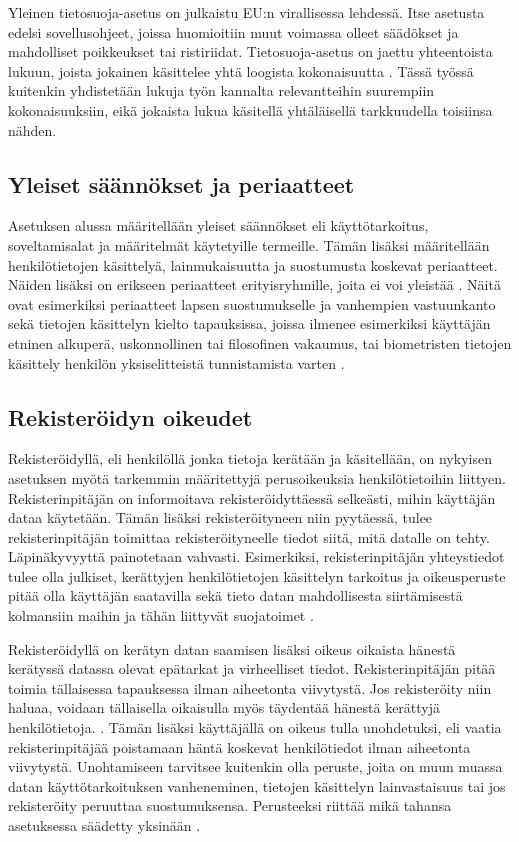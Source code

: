 \documentclass[finnish]{tktltiki}
\begin{document}
Yleinen tietosuoja-asetus on julkaistu EU:n virallisessa lehdessä. Itse asetusta edelsi sovellusohjeet, joissa huomioitiin muut voimassa olleet säädökset ja mahdolliset poikkeukset tai ristiriidat. Tietosuoja-asetus on jaettu yhteentoista lukuun, joista jokainen käsittelee yhtä loogista kokonaisuutta \cite{eu2016}. Tässä työssä kuitenkin yhdistetään lukuja työn kannalta relevantteihin suurempiin kokonaisuuksiin, eikä jokaista lukua käsitellä yhtäläisellä tarkkuudella toisiinsa nähden.

\subsection{Yleiset säännökset ja periaatteet}

Asetuksen alussa määritellään yleiset säännökset eli käyttötarkoitus, soveltamisalat ja määritelmät käytetyille termeille. Tämän lisäksi määritellään henkilötietojen käsittelyä, lainmukaisuutta ja suostumusta koskevat periaatteet. Näiden lisäksi on erikseen periaatteet erityisryhmille, joita ei voi yleistää \cite{eu2016,tikkinen}. Näitä ovat esimerkiksi periaatteet lapsen suostumukselle ja vanhempien vastuunkanto sekä tietojen käsittelyn kielto tapauksissa, joissa ilmenee esimerkiksi käyttäjän etninen alkuperä, uskonnollinen tai filosofinen vakaumus, tai biometristen tietojen käsittely henkilön yksiselitteistä tunnistamista varten \cite{eu2016,tikkinen}.

\subsection{Rekisteröidyn oikeudet}

Rekisteröidyllä, eli henkilöllä jonka tietoja kerätään ja käsitellään, on nykyisen asetuksen myötä tarkemmin määritettyjä perusoikeuksia henkilötietoihin liittyen. Rekisterinpitäjän on informoitava rekisteröidyttäessä selkeästi, mihin käyttäjän dataa käytetään. Tämän lisäksi rekisteröityneen niin pyytäessä, tulee rekisterinpitäjän toimittaa rekisteröityneelle tiedot siitä, mitä datalle on tehty. Läpinäkyvyyttä painotetaan vahvasti. Esimerkiksi, rekisterinpitäjän yhteystiedot tulee olla julkiset, kerättyjen henkilötietojen käsittelyn tarkoitus ja oikeusperuste pitää olla käyttäjän saatavilla sekä tieto datan mahdollisesta siirtämisestä kolmansiin maihin ja tähän liittyvät suojatoimet \cite{tikkinen}.

Rekisteröidyllä on kerätyn datan saamisen lisäksi oikeus oikaista hänestä kerätyssä datassa olevat epätarkat ja virheelliset tiedot. Rekisterinpitäjän pitää toimia tällaisessa tapauksessa ilman aiheetonta viivytystä. Jos rekisteröity niin haluaa, voidaan tällaisella oikaisulla myös täydentää hänestä kerättyjä henkilötietoja. \cite{eu2016}. Tämän lisäksi käyttäjällä on oikeus tulla unohdetuksi, eli vaatia rekisterinpitäjää poistamaan häntä koskevat henkilötiedot ilman aiheetonta viivytystä. Unohtamiseen tarvitsee kuitenkin olla peruste, joita on muun muassa datan käyttötarkoituksen vanheneminen, tietojen käsittelyn lainvastaisuus tai jos rekisteröity peruuttaa suostumuksensa. Perusteeksi riittää mikä tahansa asetuksessa säädetty yksinään \cite{eu2016,tikkinen}.
\end{document}
